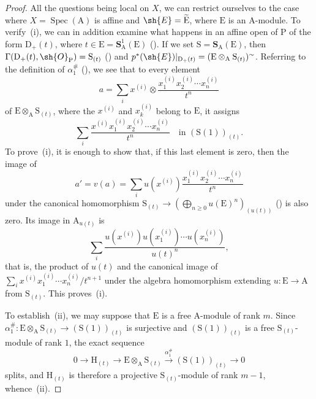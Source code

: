 \begin{proof}
All the questions being local on $X$, we can restrict ourselves to the case where $X=\operatorname{Spec}(\mathrm{A})$ is affine and $\sh{E}=\widetilde{\mathrm{E}}$, where $\mathrm{E}$ is an $\mathrm{A}$-module.
To verify~(i), we can in addition examine what happens in an affine open of $\mathrm{P}$ of the form $\mathrm{D}_+(t)$, where $t\in\mathrm{E}=\mathbf{S}_\mathrm{A}^1(\mathrm{E})$ ().
If we set $\mathrm{S}=\mathbf{S}_\mathrm{A}(\mathrm{E})$, then
$\Gamma(\mathrm{D}_+(t),\sh{O}_{\mathrm{P}})=\mathrm{S}_{(t)}$ () and
$p^*(\sh{E})|_{\mathrm{D}_+(t)}=(\mathrm{E}\otimes_\mathrm{A}\mathrm{S}_{(t)})^\sim$.
Referring to the definition of $\alpha_1^{\#}$ (), we see that to every element
\[
  a=\sum_i x^{(i)}\otimes\frac{x_1^{(i)}x_2^{(i)}\cdots x_n^{(i)}}{t^n}
\]
of $\mathrm{E}\otimes_\mathrm{A}\mathrm{S}_{(t)}$, where the $x^{(i)}$ and $x_k^{(i)}$ belong to $\mathrm{E}$, it assigns
\[
  \sum_i\frac{x^{(i)}x_1^{(i)}x_2^{(i)}\cdots x_n^{(i)}}{t^n}
  \quad\text{in }(\mathrm{S}(1))_{(t)}.
\]
To prove~(i), it is enough to show that, if this last element is zero, then the image of
\[
  a'=v(a)=\sum_i u(x^{(i)})\frac{x_1^{(i)}x_2^{(i)}\cdots x_n^{(i)}}{t^n}
\]
under the canonical homomorphism
$\mathrm{S}_{(t)}\to\left(\bigoplus_{n\geq0}u(\mathrm{E})^n\right)_{(u(t))}$ () is also zero.
Its image in $\mathrm{A}_{u(t)}$ is
\[
  \sum_i\frac{u(x^{(i)})u(x_1^{(i)})\cdots u(x_n^{(i)})}{u(t)^n},
\]
that is, the product of $u(t)$ and the canonical image of
$\sum_i x^{(i)}x_1^{(i)}\cdots x_n^{(i)}/t^{n+1}$ under the algebra homomorphism extending $u:\mathrm{E}\to\mathrm{A}$ from $\mathrm{S}_{(t)}$. This proves~(i).

To establish~(ii), we may suppose that $\mathrm{E}$ is a free $\mathrm{A}$-module of rank $m$. Since $\alpha_1^{\#}:\mathrm{E}\otimes_\mathrm{A}\mathrm{S}_{(t)}\to(\mathrm{S}(1))_{(t)}$ is surjective and $(\mathrm{S}(1))_{(t)}$ is a free $\mathrm{S}_{(t)}$-module of rank $1$, the exact sequence
\[
  0\to\mathrm{H}_{(t)}\to\mathrm{E}\otimes_\mathrm{A}\mathrm{S}_{(t)}\xrightarrow{\alpha_1^{\#}}(\mathrm{S}(1))_{(t)}\to 0
\]
splits, and $\mathrm{H}_{(t)}$ is therefore a projective $\mathrm{S}_{(t)}$-module of rank $m-1$, whence~(ii).


\end{proof}
